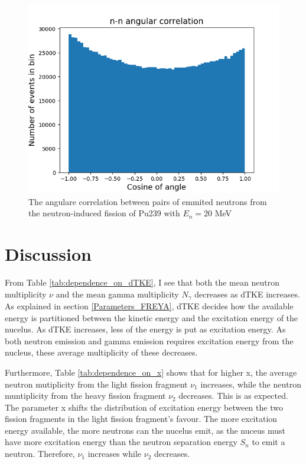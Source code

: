 \documentclass[]{article}
\begin{document}
\begin{figure} [H]
	\centering
	\includegraphics[scale=0.65]{Pu239_20_n_n_ang_corr.png}
	\caption{The angulare correlation between pairs of emmited neutrons from the neutron-induced fission of Pu239 with $E_n= 20$ MeV}
	\label{fig:Pu239_20_n_n_ang_corr}
\end{figure}

\section{Discussion}

From Table \ref{tab:dependence_on_dTKE}, I see that both the mean neutron multiplicity $\nu$ and the mean gamma multiplicity $N_{\gamma}$ decreases as dTKE increases. As explained in section \ref{Parameters_FREYA}, dTKE decides how the available energy is partitioned between the kinetic energy and the excitation energy of the nucelus. As dTKE increases, less of the energy is put as excitation energy. As both neutron emission and gamma emission requires excitation energy from the nucleus, these average multiplicity of these decreases.\par 
\vspace{3mm}

Furthermore, Table \ref{tab:dependence_on_x} shows that for higher x, the average neutron mutiplicity from the light fission fragment $\nu_1$ increases, while the neutron muntiplicity from the heavy fission fragment $\nu_2$ decreases. This is as expected. The parameter x shifts the distribution of excitation energy between the two fission fragments in the light fission fragment's favour. The more excitation energy available, the more neutrons can the nucelus emit, as the nuceus must have more excitation energy than the neutron separation energy $S_n$ to emit a neutron. Therefore, $\nu_1$ increases while $\nu_2$ decreases. \par 
\vspace{3mm}
\end{document}
